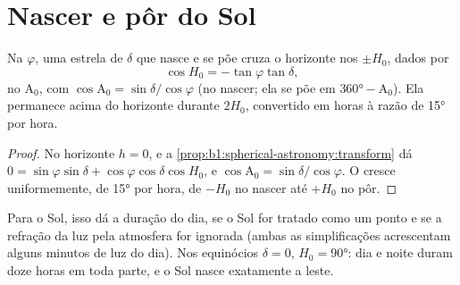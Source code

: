 \section{Nascer e pôr do Sol}

\begin{proposition}\label{prop:b1:spherical-astronomy:rising}
Na  $\varphi$, uma estrela de  $\delta$ que nasce e se põe cruza o horizonte nos  $\pm H_0$, dados por
\[
  \cos H_0 = -\tan\varphi\tan\delta ,
\]
no  $\mathrm{A}_0$, com $\cos\mathrm{A}_0 = \sin\delta/\cos\varphi$ (no nascer; ela se põe em $\ang{360} - \mathrm{A}_0$). Ela permanece acima do horizonte durante $2H_0$, convertido em horas à razão de \ang{15} por hora.
\end{proposition}

\begin{proof}
No horizonte $h = 0$, e a \cref{prop:b1:spherical-astronomy:transform} dá $0 = \sin\varphi\sin\delta + \cos\varphi\cos\delta\cos H_0$, e $\cos\mathrm{A}_0 = \sin\delta/\cos\varphi$. O  cresce uniformemente, de \ang{15} por hora, de $-H_0$ no nascer até $+H_0$ no pôr.
\end{proof}

Para o Sol, isso dá a duração do dia, se o Sol for tratado como um ponto e se a refração da luz pela atmosfera for ignorada (ambas as simplificações acrescentam alguns minutos de luz do dia). Nos equinócios $\delta = 0$, $H_0 = \ang{90}$: dia e noite duram doze horas em toda parte, e o Sol nasce exatamente a leste.


